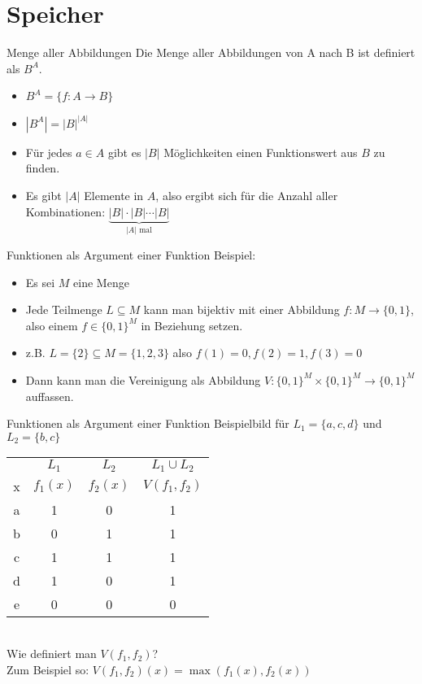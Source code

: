 \section{Speicher}

\begin{frame}{Menge aller Abbildungen}
Die Menge aller Abbildungen von A nach B ist definiert als $B^A$.
\begin{itemize}
\item $B^A=\{f:A\rightarrow B\}$
\item $|B^A|=|B|^{|A|}$
\item Für jedes $a\in A$ gibt es $|B|$ Möglichkeiten einen Funktionswert aus $B$ zu finden.
\item Es gibt $|A|$ Elemente in $A$, also ergibt sich für die Anzahl aller Kombinationen: $\underbrace{|B|\cdot |B| \cdots |B|}_{|A| \text{ mal}}$
\end{itemize}
\end{frame}

\begin{frame}{Funktionen als Argument einer Funktion}
Beispiel:
\begin{itemize}
\item Es sei $M$ eine Menge
\item Jede Teilmenge
  $L\subseteq M$ kann man bijektiv mit einer Abbildung $f: M\to
  \{0,1\}$, also einem $f\in \{0,1\}^M$ in Beziehung setzen.
\item z.B. $L=\{2\}\subseteq M=\{1,2,3\}$ also $f(1)=0,f(2)=1,f(3)=0$
\item Dann kann man die Vereinigung als Abbildung $V: \{0,1\}^M \times
  \{0,1\}^M\to \{0,1\}^M$ auffassen.
\end{itemize}
\end{frame}

\begin{frame}{Funktionen als Argument einer Funktion}
Beispielbild für
  $L_1=\{a,c,d\}$ und $L_2=\{b,c\}$
  
  \begin{tabular}{cccc}
      & $L_1$ & $L_2$ & $L_1\cup L_2$ \\
    x & $f_1(x)$ & $f_2(x)$ & $V(f_1,f_2)$ \\
    \midrule
    a & 1 & 0 & 1 \\
    b & 0 & 1 & 1 \\
    c & 1 & 1 & 1 \\
    d & 1 & 0 & 1 \\
    e & 0 & 0 & 0 \\
  \end{tabular}\\
Wie definiert man $V(f_1,f_2)$? \\
\pause
Zum Beispiel so:
$V(f_1,f_2) (x) = \max(f_1(x),f_2(x))$
\end{frame}


